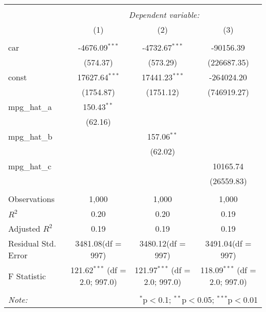 \begin{table}[!htbp] \centering
\begin{tabular}{@{\extracolsep{5pt}}lccc}
\\[-1.8ex]\hline
\hline \\[-1.8ex]
& \multicolumn{3}{c}{\textit{Dependent variable:}} \
\cr \cline{3-4}
\\[-1.8ex] & (1) & (2) & (3) \\
\hline \\[-1.8ex]
 car & -4676.09$^{***}$ & -4732.67$^{***}$ & -90156.39$^{}$ \\
  & (574.37) & (573.29) & (226687.35) \\
 const & 17627.64$^{***}$ & 17441.23$^{***}$ & -264024.20$^{}$ \\
  & (1754.87) & (1751.12) & (746919.27) \\
 mpg_hat_a & 150.43$^{**}$ & & \\
  & (62.16) & & \\
 mpg_hat_b & & 157.06$^{**}$ & \\
  & & (62.02) & \\
 mpg_hat_c & & & 10165.74$^{}$ \\
  & & & (26559.83) \\
\hline \\[-1.8ex]
 Observations & 1,000 & 1,000 & 1,000 \\
 $R^2$ & 0.20 & 0.20 & 0.19 \\
 Adjusted $R^2$ & 0.19 & 0.19 & 0.19 \\
 Residual Std. Error & 3481.08(df = 997) & 3480.12(df = 997) & 3491.04(df = 997)  \\
 F Statistic & 121.62$^{***}$ (df = 2.0; 997.0) & 121.97$^{***}$ (df = 2.0; 997.0) & 118.09$^{***}$ (df = 2.0; 997.0) \\
\hline
\hline \\[-1.8ex]
\textit{Note:} & \multicolumn{3}{r}{$^{*}$p$<$0.1; $^{**}$p$<$0.05; $^{***}$p$<$0.01} \\
\end{tabular}
\end{table}